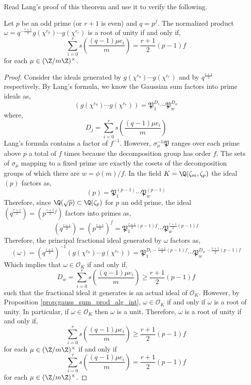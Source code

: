 \documentclass[12pt]{article}
\begin{document}
Read Lang's proof of this theorem and use it to verify the following.

\newcommand{\iO}{\mathcal{O}}
\newcommand{\s}[1]{s\left( #1 \right)}
\newcommand{\Pf}{\mathfrak{P}}

\begin{theorem} \label{thm:gauss_sum_is_root_of_unity_ideal_factorization_counting_condition}
Let $p$ be an odd prime (or $r + 1$ is even) and $q = p^f$. The normalized product $\omega = q^{-\frac{r+1}{2}} g(\chi^{e_0}) \cdots g(\chi^{e_r})$ is a root of unity if and only if,
\[ \sum_{i = 0}^r s\left(\frac{(q-1) \mu e_i}{m}\right) = \frac{r+1}{2} (p - 1) f \]
for each $\mu \in (\Z / m \Z)^\times$.
\end{theorem}

\begin{proof}
Consider the ideals generated by $g(\chi^{e_0}) \cdots g(\chi^{e_r})$ and by $q^{\frac{r+1}{2}}$ respectively. By Lang's formula, we know the Gaussian sum factors into prime ideals as,
\[ (g(\chi^{e_0}) \cdots g(\chi^{e_r})) = \mathfrak{P}_1^{D_1} \cdots \mathfrak{P}_{w}^{D_{w}} \]
where,
\[ D_j = \sum_{i = 0}^r s\left(\frac{(q-1) \mu e_i}{m}\right) \]
Lang's formula contains a factor of $f^{-1}$. However, $\sigma_\mu^{-1} \mathfrak{P}$ ranges over each prime above $p$ a total of $f$ times because the decomposition group has order $f$. The sets of $\sigma_\mu$ mapping to a fixed prime are exactly the cosets of the decomposition groups of which there are $w = \phi(m)/f$. In the field $K = \Q(\zeta_m, \zeta_p)$ the ideal $(p)$ factors as,
\[ (p) = \mathfrak{P}_1^{(p-1)} \cdots \mathfrak{P}_w^{(p-1)} \] Therefore, since $\Q(\sqrt{p}) \subset \Q(\zeta_p)$ for $p$ an odd prime, the ideal $(q^{\frac{r+1}{2}}) = (p^{\frac{r+1}{2} f})$ factors into primes as,
\[ (q^\frac{r+1}{2}) = (p^\frac{r+1}{2})^f = \mathfrak{P}_1^{\frac{r+1}{2} (p-1) f} \cdots \mathfrak{P}_w^{\frac{r+1}{2} (p-1) f} \]
Therefore, the principal fractional ideal generated by $\omega$ factors as,
\[ (\omega) = (q^{\frac{r+1}{2}})^{-1} (g(\chi^{e_0}) \cdots g(\chi^{e_r})) = \mathfrak{P}_1^{D_1 - \frac{r+1}{2} (p-1) f} \cdots \mathfrak{P}_{w}^{D_{w} - \frac{r+1}{2} (p-1) f } \] 
Which implies that $\omega \in \iO_K$ if and only if,
\[ D_w =\sum_{i = 0}^r s\left(\frac{(q-1) \mu e_i}{m}\right) \ge \frac{r+1}{2} (p - 1) f \]
such that the fractional ideal it generates is an actual ideal of $\iO_{K}$. However, by Proposition \ref{prop:gauss_sum_prod_alg_int}, $\omega \in \iO_K$ if and only if $\omega$ is a root of unity. In particular, if $\omega \in \iO_K$ then $\omega$ is a unit. Therefore, $\omega$ is a root of unity if and only if,
\[ \sum_{i = 0}^r s\left(\frac{(q-1) \mu e_i}{m}\right) \ge \frac{r+1}{2} (p - 1) f \]
for each $\mu \in (\Z / m \Z)^\times$
if and only if
\[ \sum_{i = 0}^r s\left(\frac{(q-1) \mu e_i}{m}\right) = \frac{r+1}{2} (p - 1) f \]
for each $\mu \in (\Z / m \Z)^\times$. 
\end{proof}
\end{document}
